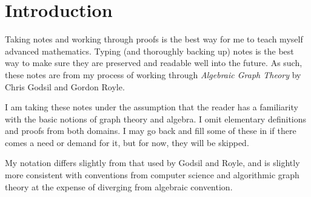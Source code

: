 \documentclass[11pt]{article}
\author{%
	Notes by \notetaker}
\title{\coursetitle}
\date{\institution, \courseterm}
\theoremstyle{definition}
\begin{document}
	
	
	
	
	\maketitle
	\thispagestyle{empty}
	\setcounter{page}{-1}
	\vspace{0.3in}
	
	
	
	\begin{center}
		\begin{minipage}[t]{0.9\textwidth}
			\begin{multicols}{2}
				\tableofcontents
			\end{multicols}
		\end{minipage}
	\end{center}
	
	
	
	\newpage
	\thispdfpagelabel{-}
	\thispagestyle{empty}
	
	
	
	\section*{Introduction}
	Taking notes and working through proofs is the best way for me to teach myself advanced mathematics.  Typing (and thoroughly backing up) notes is the best way to make sure they are preserved and readable well into the future.  As such, these notes are from my process of working through \textit{Algebraic Graph Theory} by Chris Godsil and Gordon Royle.
	
	I am taking these notes under the assumption that the reader has a familiarity with the basic notions of graph theory and algebra.  I omit elementary definitions and proofs from both domains.  I may go back and fill some of these in if there comes a need or demand for it, but for now, they will be skipped.
	
	My notation differs slightly from that used by Godsil and Royle, and is slightly more consistent with conventions from computer science and algorithmic graph theory at the expense of diverging from algebraic convention.
	
\end{document}
